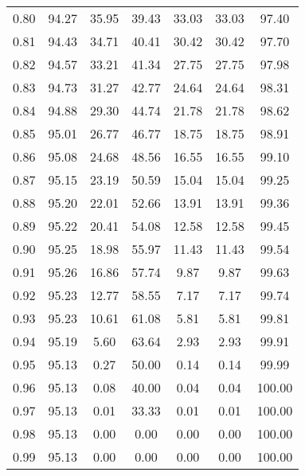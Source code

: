 \begin{tabular}{|c|c|c|c|c|c|c|}
      0.80 &     94.27 &     35.95 &      39.43 &   33.03 &      33.03 &         97.40 \\
      0.81 &     94.43 &     34.71 &      40.41 &   30.42 &      30.42 &         97.70 \\
      0.82 &     94.57 &     33.21 &      41.34 &   27.75 &      27.75 &         97.98 \\
      0.83 &     94.73 &     31.27 &      42.77 &   24.64 &      24.64 &         98.31 \\
      0.84 &     94.88 &     29.30 &      44.74 &   21.78 &      21.78 &         98.62 \\
      0.85 &     95.01 &     26.77 &      46.77 &   18.75 &      18.75 &         98.91 \\
      0.86 &     95.08 &     24.68 &      48.56 &   16.55 &      16.55 &         99.10 \\
      0.87 &     95.15 &     23.19 &      50.59 &   15.04 &      15.04 &         99.25 \\
      0.88 &     95.20 &     22.01 &      52.66 &   13.91 &      13.91 &         99.36 \\
      0.89 &     95.22 &     20.41 &      54.08 &   12.58 &      12.58 &         99.45 \\
      0.90 &     95.25 &     18.98 &      55.97 &   11.43 &      11.43 &         99.54 \\
      0.91 &     95.26 &     16.86 &      57.74 &    9.87 &       9.87 &         99.63 \\
      0.92 &     95.23 &     12.77 &      58.55 &    7.17 &       7.17 &         99.74 \\
      0.93 &     95.23 &     10.61 &      61.08 &    5.81 &       5.81 &         99.81 \\
      0.94 &     95.19 &      5.60 &      63.64 &    2.93 &       2.93 &         99.91 \\
      0.95 &     95.13 &      0.27 &      50.00 &    0.14 &       0.14 &         99.99 \\
      0.96 &     95.13 &      0.08 &      40.00 &    0.04 &       0.04 &        100.00 \\
      0.97 &     95.13 &      0.01 &      33.33 &    0.01 &       0.01 &        100.00 \\
      0.98 &     95.13 &      0.00 &       0.00 &    0.00 &       0.00 &        100.00 \\
      0.99 &     95.13 &      0.00 &       0.00 &    0.00 &       0.00 &        100.00 \\
\bottomrule
\end{tabular}
